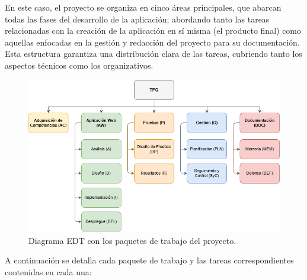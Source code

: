 En este caso, el proyecto se organiza en cinco áreas principales, que abarcan todas las fases del desarrollo de la aplicación; abordando tanto las tareas relacionadas con la creación de la aplicación en sí misma (el producto final) como aquellas enfocadas en la gestión y redacción del proyecto para su documentación. Esta estructura garantiza una distribución clara de las tareas, cubriendo tanto los aspectos técnicos como los organizativos.

\begin{figure}[H]
    \centering
    \includegraphics[width=\textwidth]{figures/edt.png}
    \caption{Diagrama EDT con los paquetes de trabajo del proyecto.}
    \label{fig:edt}
\end{figure}

A continuación se detalla cada paquete de trabajo y las tareas correspondientes contenidas en cada una:


